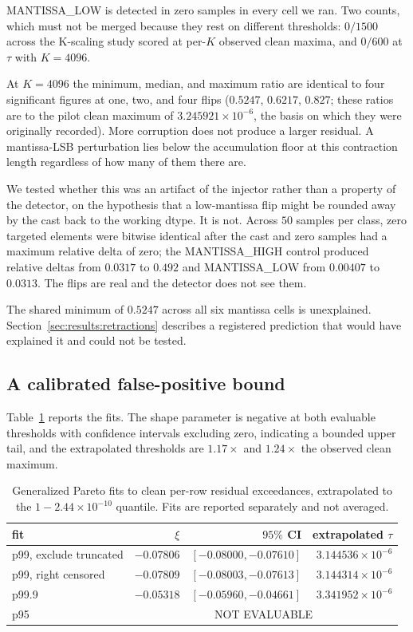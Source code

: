 \documentclass[11pt]{article}
\begin{document}
MANTISSA\_LOW is detected in zero samples in every cell we ran. Two counts,
which must not be merged because they rest on different thresholds:
$0/1500$ across the K-scaling study scored at per-$K$ observed clean maxima,
and $0/600$ at $\tau$ with $K = 4096$.

At $K = 4096$ the minimum, median, and maximum ratio are identical to four
significant figures at one, two, and four flips ($0.5247$, $0.6217$, $0.827$;
these ratios are to the pilot clean maximum of $3.245921 \times 10^{-6}$, the
basis on which they were originally recorded). More corruption does not produce a larger
residual. A mantissa-LSB perturbation lies below the accumulation floor at this
contraction length regardless of how many of them there are.

We tested whether this was an artifact of the injector rather than a property
of the detector, on the hypothesis that a low-mantissa flip might be rounded
away by the cast back to the working dtype. It is not. Across $50$ samples per
class, zero targeted elements were bitwise identical after the cast and zero
samples had a maximum relative delta of zero; the MANTISSA\_HIGH control
produced relative deltas from $0.0317$ to $0.492$ and MANTISSA\_LOW from
$0.00407$ to $0.0313$. The flips are real and the detector does not see them.

The shared minimum of $0.5247$ across all six mantissa cells is unexplained.
Section~\ref{sec:results:retractions} describes a registered prediction that
would have explained it and could not be tested.

\subsection{A calibrated false-positive bound}
\label{sec:results:fpr}

Table~\ref{tab:gpd} reports the fits. The shape parameter is negative at both
evaluable thresholds with confidence intervals excluding zero, indicating a
bounded upper tail, and the extrapolated thresholds are $1.17\times$ and
$1.24\times$ the observed clean maximum.

\begin{table}[t]
\centering
\begin{tabular}{lrrr}
\toprule
fit & $\xi$ & $95\%$ CI & extrapolated $\tau$ \\
\midrule
p99, exclude truncated  & $-0.07806$ & $[-0.08000, -0.07610]$ & $3.144536 \times 10^{-6}$ \\
p99, right censored     & $-0.07809$ & $[-0.08003, -0.07613]$ & $3.144314 \times 10^{-6}$ \\
p99.9                   & $-0.05318$ & $[-0.05960, -0.04661]$ & $3.341952 \times 10^{-6}$ \\
p95                     & \multicolumn{3}{c}{NOT EVALUABLE} \\
\bottomrule
\end{tabular}
\caption{Generalized Pareto fits to clean per-row residual exceedances,
extrapolated to the $1 - 2.44 \times 10^{-10}$ quantile. Fits are reported
separately and not averaged.}
\label{tab:gpd}
\end{table}
\end{document}
